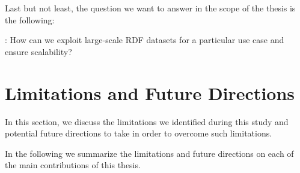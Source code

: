 Last but not least, the question we want to answer in the scope of the thesis is the following:

\begin{tcolorbox}
\textbf{\rqNr[RQ4]\label{rqc:4}}: How can we exploit large-scale RDF datasets for a particular use case and ensure scalability?
\end{tcolorbox}


\section{Limitations and Future Directions}
In this section, we discuss the limitations we identified during this study and potential future directions to take in order to overcome such limitations.

In the following we summarize the limitations and future directions on each of the main contributions of this thesis.

